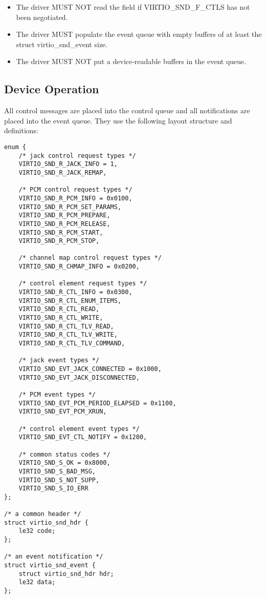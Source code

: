
\begin{itemize}
\item The driver MUST NOT read the  field
if VIRTIO_SND_F_CTLS has not been negotiated.
\item The driver MUST populate the event queue with empty buffers of at least
the struct virtio_snd_event size.
\item The driver MUST NOT put a device-readable buffers in the event queue.
\end{itemize}

\subsection{Device Operation}\label{sec:Device Types / Sound Device / Device Operation}

All control messages are placed into the control queue and all notifications
are placed into the event queue. They use the following layout structure and
definitions:

\begin{lstlisting}
enum {
    /* jack control request types */
    VIRTIO_SND_R_JACK_INFO = 1,
    VIRTIO_SND_R_JACK_REMAP,

    /* PCM control request types */
    VIRTIO_SND_R_PCM_INFO = 0x0100,
    VIRTIO_SND_R_PCM_SET_PARAMS,
    VIRTIO_SND_R_PCM_PREPARE,
    VIRTIO_SND_R_PCM_RELEASE,
    VIRTIO_SND_R_PCM_START,
    VIRTIO_SND_R_PCM_STOP,

    /* channel map control request types */
    VIRTIO_SND_R_CHMAP_INFO = 0x0200,

    /* control element request types */
    VIRTIO_SND_R_CTL_INFO = 0x0300,
    VIRTIO_SND_R_CTL_ENUM_ITEMS,
    VIRTIO_SND_R_CTL_READ,
    VIRTIO_SND_R_CTL_WRITE,
    VIRTIO_SND_R_CTL_TLV_READ,
    VIRTIO_SND_R_CTL_TLV_WRITE,
    VIRTIO_SND_R_CTL_TLV_COMMAND,

    /* jack event types */
    VIRTIO_SND_EVT_JACK_CONNECTED = 0x1000,
    VIRTIO_SND_EVT_JACK_DISCONNECTED,

    /* PCM event types */
    VIRTIO_SND_EVT_PCM_PERIOD_ELAPSED = 0x1100,
    VIRTIO_SND_EVT_PCM_XRUN,

    /* control element event types */
    VIRTIO_SND_EVT_CTL_NOTIFY = 0x1200,

    /* common status codes */
    VIRTIO_SND_S_OK = 0x8000,
    VIRTIO_SND_S_BAD_MSG,
    VIRTIO_SND_S_NOT_SUPP,
    VIRTIO_SND_S_IO_ERR
};

/* a common header */
struct virtio_snd_hdr {
    le32 code;
};

/* an event notification */
struct virtio_snd_event {
    struct virtio_snd_hdr hdr;
    le32 data;
};
\end{lstlisting}

